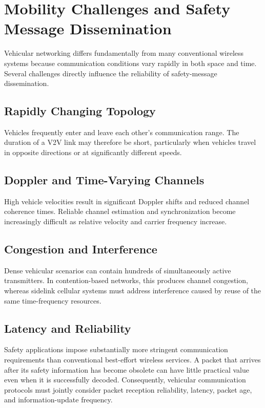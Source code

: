 \section{Mobility Challenges and Safety Message Dissemination}
\label{sec:mobility_challenges}

Vehicular networking differs fundamentally from many conventional wireless
systems because communication conditions vary rapidly in both space and
time. Several challenges directly influence the reliability of safety-message
dissemination.

\subsection{Rapidly Changing Topology}

Vehicles frequently enter and leave each other's communication range. The
duration of a V2V link may therefore be short, particularly when vehicles
travel in opposite directions or at significantly different speeds.

\subsection{Doppler and Time-Varying Channels}

High vehicle velocities result in significant Doppler shifts and reduced
channel coherence times. Reliable channel estimation and synchronization
become increasingly difficult as relative velocity and carrier frequency
increase.

\subsection{Congestion and Interference}

Dense vehicular scenarios can contain hundreds of simultaneously active
transmitters. In contention-based networks, this produces channel congestion,
whereas sidelink cellular systems must address interference caused by reuse of
the same time-frequency resources.

\subsection{Latency and Reliability}

Safety applications impose substantially more stringent communication
requirements than conventional best-effort wireless services. A packet that
arrives after its safety information has become obsolete can have little
practical value even when it is successfully decoded. Consequently,
vehicular communication protocols must jointly consider packet reception
reliability, latency, packet age, and information-update frequency.

